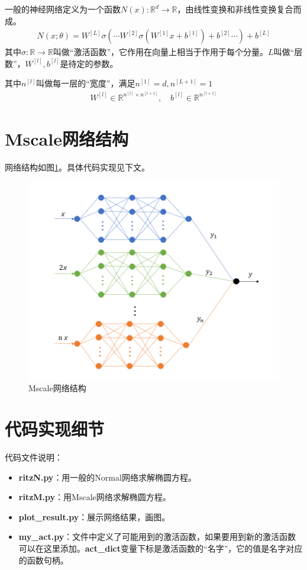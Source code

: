 \documentclass[12pt,a4paper]{article}
\begin{document}
一般的神经网络定义为一个函数$N(x): \mathbb{R}^d \rightarrow \mathbb{R}$，由线性变换和非线性变换复合而成。
\begin{align*}
N(x; \theta) = W^{[L]} \sigma(\cdots W^{[2]} \sigma(W^{[1]} x + b^{[1]}) + b^{[2]} \cdots) + b^{[L]}
\end{align*}
其中$\sigma: \mathbb{R} \rightarrow \mathbb{R}$叫做“激活函数”，它作用在向量上相当于作用于每个分量。$L$叫做“层数”，$W^{[l]}, b^{[l]}$是待定的参数。

其中$n^{[l]}$叫做每一层的“宽度”，满足$n^{[1]} = d, n^{[L+1]} = 1$
\begin{align*}
W^{[l]} \in \mathbb{R}^{n^{[l]} \times n^{[l+1]}}, \quad b^{[l]} \in \mathbb{R}^{n^{[l+1]}}
\end{align*}

\section*{Mscale网络结构}

网络结构如图\ref{net}。具体代码实现见下文。

\begin{figure}[h]
\centering
\includegraphics[width=0.5\linewidth]{MscaleNet2}
\caption{Mscale网络结构}
\label{net}
\end{figure}

\section*{代码实现细节}

代码文件说明：

\begin{itemize}
\item \textbf{ritzN.py}：用一般的Normal网络求解椭圆方程。
\item \textbf{ritzM.py}：用Mscale网络求解椭圆方程。
\item \textbf{plot\_result.py}：展示网络结果，画图。
\item \textbf{my\_act.py}：文件中定义了可能用到的激活函数，如果要用到新的激活函数可以在这里添加。\textbf{act\_dict}变量下标是激活函数的“名字”，它的值是名字对应的函数句柄。
\end{itemize}
\end{document}
